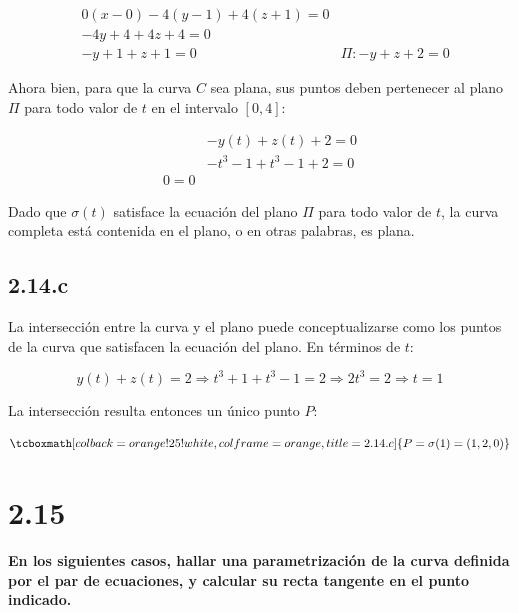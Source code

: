 \documentclass{article}
\begin{document}
\begin{subequations}
\begin{align}
& 0 (x-0) -4 (y-1) + 4 (z+1) = 0 \\
& -4y +4 + 4z + 4 = 0 \\
& -y + 1 + z + 1 = 0
& \Pi: -y + z + 2 = 0
\end{align}
\end{subequations}

Ahora bien, para que la curva $C$ sea plana, sus puntos deben pertenecer al plano $\Pi$ para todo valor de $t$ en el intervalo $[0,4]$:

\begin{subequations}
\begin{align}
& -y(t) + z(t) + 2 = 0 \\
& -t^3-1 +t^3-1 + 2 = 0\\
0 = 0
\end{align}
\end{subequations}

Dado que $\sigma(t)$ satisface la ecuación del plano $\Pi$ para todo valor de $t$, la curva completa está contenida en el plano, o en otras palabras, es plana.

\subsection*{2.14.c}
\label{subsec:2.14.c}

La intersección entre la curva y el plano puede conceptualizarse como los puntos de la curva que satisfacen la ecuación del plano. En términos de $t$:

\begin{equation}
y(t) + z(t) = 2 \Rightarrow t^3 +1 +t^3 -1 = 2 \Rightarrow 2t^3 = 2 \Rightarrow t = 1
\end{equation}

La intersección resulta entonces un único punto $P$:

\begin{equation}
\tcboxmath[colback=orange!25!white,colframe=orange,title=2.14.c]
{
P = \sigma(1) = (1, 2, 0)
}
\end{equation}

\section*{2.15}
\label{sec:2.15}

\textbf{En los siguientes casos, hallar una parametrización de la curva definida por el par de ecuaciones, y calcular su recta tangente en el punto indicado.}
\end{document}
